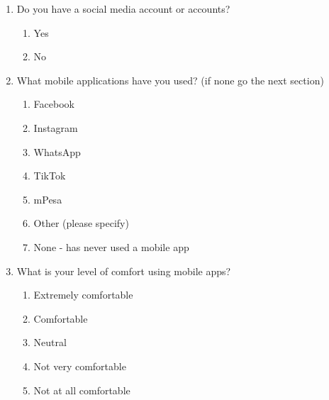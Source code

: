 \begin{enumerate}
\begin{enumerate}
\begin{enumerate}
            \end{enumerate}  
        \item Do you have a social media account or accounts?
            \begin{enumerate}
                \item Yes
                \item No
            \end{enumerate}  
        \item What mobile applications have you used? (if none go the next section)
        \begin{enumerate}
            \item Facebook
            \item Instagram
            \item WhatsApp
            \item TikTok
            \item mPesa
            \item Other (please specify)
            \item None - has never used a mobile app
        \end{enumerate}
        \item What is your level of comfort using mobile apps?
        \begin{enumerate}
            \item Extremely comfortable
            \item Comfortable
            \item Neutral
            \item Not very comfortable
            \item Not at all comfortable
        \end{enumerate}
    \end{enumerate}


\end{enumerate}
